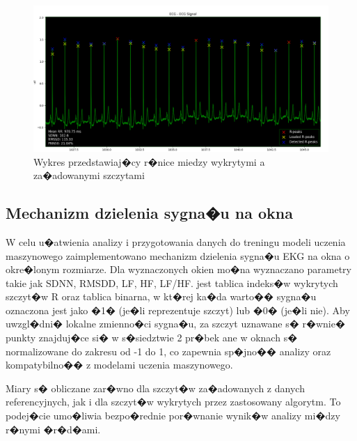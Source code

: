 \begin{figure}[ht]
    \centering
    \includegraphics[scale=0.5]{Rysunki/temp.PNG}
    \caption{Wykres przedstawiaj�cy r�nice miedzy wykrytymi a za�adowanymi szczytami}
    \label{fig/ekgGraph}
\end{figure}

\subsection{Mechanizm dzielenia sygna�u na okna}
W celu u�atwienia analizy i przygotowania danych do treningu modeli uczenia
maszynowego zaimplementowano mechanizm dzielenia sygna�u EKG na okna o
okre�lonym rozmiarze. Dla wyznaczonych okien mo�na wyznaczano parametry takie
jak SDNN, RMSDD, LF, HF, LF/HF. jest tablica indeks�w wykrytych szczyt�w R oraz
tablica binarna, w kt�rej ka�da warto�� sygna�u oznaczona jest jako �1� (je�li
reprezentuje szczyt) lub �0� (je�li nie). Aby uwzgl�dni� lokalne zmienno�ci
sygna�u, za szczyt uznawane s� r�wnie� punkty znajduj�ce si� w s�siedztwie 2
pr�bek ane w oknach s� normalizowane do zakresu od -1 do 1, co zapewnia
sp�jno�� analizy oraz kompatybilno�� z modelami uczenia maszynowego.

Miary s� obliczane zar�wno dla szczyt�w za�adowanych z danych referencyjnych,
jak i dla szczyt�w wykrytych przez zastosowany algorytm. To podej�cie umo�liwia
bezpo�rednie por�wnanie wynik�w analizy mi�dzy r�nymi �r�d�ami.

